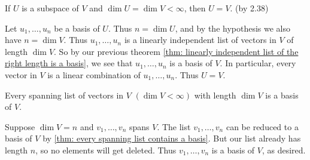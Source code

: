 \begin{thm} 
  \label{thm: subspace of full dimension equals the whole space}
  If $U$ is a subspace of $V$ and $\dim U = \dim V<\infty$, then $U=V$. (by 2.38)
\end{thm}
\begin{prf}
  Let $u_1, \ldots, u_n$ be a basis of $U$. Thus $n = \dim U$, and by the hypothesis we also have $n = \dim V$. Thus $u_1, \ldots, u_n$ is a linearly independent list of vectors in $V$ of length $\dim V$. So by our previous theorem \ref{thm: linearly independent list of the right length is a basis}, we see that $u_1, \ldots, u_n$ is a basis of $V$. In particular, every vector in $V$ is a linear combination of $u_1, \ldots, u_n$. Thus $U=V$.
\end{prf}

\setcounter{thm}{41}
\begin{thm} 
  \label{thm: spanning list of the right length}
  Every spanning list of vectors in $V$ $(\dim V < \infty)$ with length $\dim V$ is a basis of $V$.
\end{thm}
\begin{prf}
  Suppose $\dim V = n$ and $v_1, \ldots, v_n$ spans $V$. The list $v_1, \ldots, v_n$ can be reduced to a basis of $V$ by \ref{thm: every spanning list contains a basis}. But our list already has length $n$, so no elements will get deleted. Thus $v_1, \ldots, v_n$ is a basis of $V$, as desired.
\end{prf}

